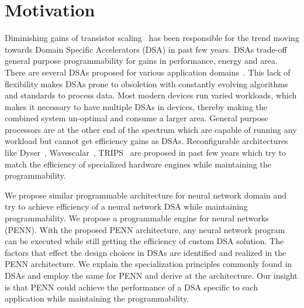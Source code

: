 \section{Motivation}\label{sec:motivation}
Diminishing gains of transistor scaling~\cite{end_of_moore1,end_of_moore2, end_of_moore3} has been responsible for the trend
moving towards Domain Specific Accelerators (DSA) in past few years. 
DSAs trade-off general purpose programmability for gains in performance, energy and area. 
There are several DSAs proposed for various application domains~\cite{chen2014diannao,pudiannao,harp,ibm_power}.
This lack of flexibility makes DSAs prone to obsoletion with constantly evolving 
algorithms and standards to process data. 
Most modern devices run varied workloads, 
which makes it necessary to have multiple DSAs in devices, thereby making the combined system un-optimal 
and consume a larger area. 
General purpose processors are at the other end of the spectrum which are capable of
running any workload but cannot get efficiency gains as DSAs.
Reconfigurable architectures like Dyser~\cite{ieeemicro12:dyser}, Wavescalar~\cite{wavescalar}, TRIPS~\cite{isca03:TRIPS} are proposed
in past few years which try to match the efficiency of specialized hardware engines while maintaining the programmability. 


We propose similar programmable architecture for neural network domain
and try to achieve efficiency of a neural network DSA while maintaining programmability. We propose a programmable engine for neural networks (PENN).
With the proposed PENN architecture, any neural network program can be executed 
while still getting the efficiency of custom DSA solution.
The factors that effect the design choices in DSAs are identified and realized in the PENN
architecture. We explain the specialization principles commonly found in DSAs and employ the same
for PENN and derive at the architecture. Our insight is that PENN could achieve the performance of a
DSA specific to each application while maintaining the programmability. 




